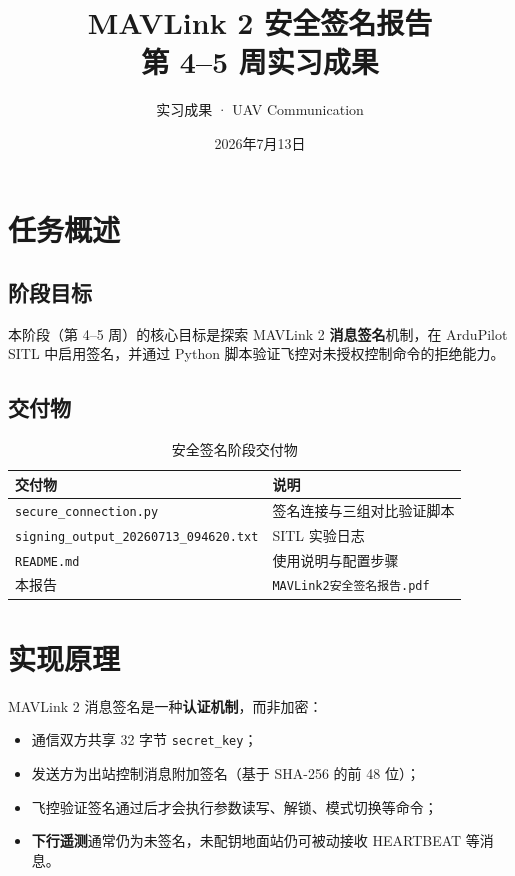 \documentclass[12pt,a4paper]{article}
\title{\textbf{MAVLink 2 安全签名报告} \\ \large 第 4--5 周实习成果}
\author{实习成果 · UAV Communication}
\date{2026年7月13日}
\begin{document}
\maketitle
\tableofcontents
\newpage

\section{任务概述}

\subsection{阶段目标}

本阶段（第 4--5 周）的核心目标是探索 MAVLink 2 \textbf{消息签名}机制，在 ArduPilot SITL 中启用签名，并通过 Python 脚本验证飞控对未授权控制命令的拒绝能力。

\subsection{交付物}

\begin{table}[htbp]
\centering
\caption{安全签名阶段交付物}
\begin{tabular}{p{4.5cm}p{8.5cm}}
\toprule
\textbf{交付物} & \textbf{说明} \\
\midrule
\texttt{secure\_connection.py} & 签名连接与三组对比验证脚本 \\
\texttt{signing\_output\_20260713\_094620.txt} & SITL 实验日志 \\
\texttt{README.md} & 使用说明与配置步骤 \\
本报告 & \texttt{MAVLink2安全签名报告.pdf} \\
\bottomrule
\end{tabular}
\end{table}

\section{实现原理}

MAVLink 2 消息签名是一种\textbf{认证机制}，而非加密：

\begin{itemize}[leftmargin=2em]
    \item 通信双方共享 32 字节 \texttt{secret\_key}；
    \item 发送方为出站控制消息附加签名（基于 SHA-256 的前 48 位）；
    \item 飞控验证签名通过后才会执行参数读写、解锁、模式切换等命令；
    \item \textbf{下行遥测}通常仍为未签名，未配钥地面站仍可被动接收 HEARTBEAT 等消息。
\end{itemize}
\end{document}
